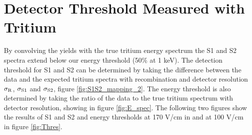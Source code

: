 \section{Detector Threshold Measured with Tritium}

By convolving the yields with the true tritium energy spectrum the S1 and S2 spectra extend below our energy threshold (50\% at 1 keV). The detection threshold for S1 and S2 can be determined by taking the difference between the data and the expected tritium spectra with recombination and detector resolution $\rm \sigma_R$, $\rm \sigma_{S1}$ and $\rm \sigma_{S2}$, figure \ref{fig:S1S2_mapping_2}. The energy threshold is also determined by taking the ratio of the data to the true tritium spectrum with detector resolution, showing in figure \ref{fig:E_spec}. The following two figures show the results of S1 and S2 and energy thresholds at 170 V/cm in and at 100 V/cm in figure \ref{fig:Thres}.

